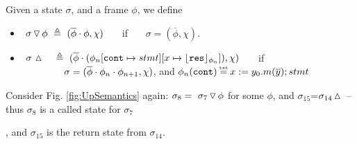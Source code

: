 { 
\begin{definition}
\label{def:push:frame}
Given a state $\sigma$, and a frame $\phi$,  we define
\begin{itemize}
\item
 $  \ {\sigma} \, {\triangledown}\, {\phi}  \ \triangleq \ ({\overline{\phi}\cdot\phi}, \chi)$ \ \ \  if \ \ \  $\sigma=(\overline{\phi}, \chi)$.
\item
$ \ \sigma\, \popSymbol \ \ \  \triangleq\   { (\overline{\phi}\cdot (\phi_n[\prg{cont}\mapsto stmt][x \mapsto \interpret {\phi_n}{\prg{res}}]), \chi)}$ \ \ \  if \\
 $\strut \hspace{1.5cm} \sigma=(\overline{\phi}\cdot\phi_n\cdot\phi_{n+1}, \chi)$, and $\phi_n(\prg{cont})\txteq x:= y_0.m(\overline y); stmt $
\end{itemize}
 \end{definition}

Consider Fig. \ref{fig:UpSemantics} again: $\sigma_8 =  \ {\sigma_7} \, {\triangledown}\, {\phi} $ for some $\phi$, and  $\sigma_{15}$=$\sigma_{14} \, {\vartriangle}\,$
--  thus $\sigma_8$ is a called state for 
 $\sigma_7$}, and  $\sigma_{15}$ is the return state from 
 $\sigma_{14}$.

